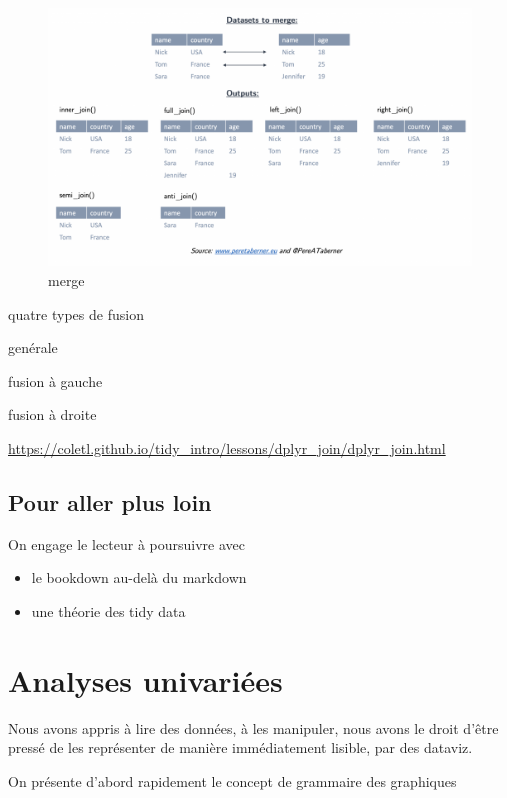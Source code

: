 \documentclass[
]{book}
\providecommand{\tightlist}{%
  \setlength{\itemsep}{0pt}\setlength{\parskip}{0pt}}
\begin{document}
\begin{figure}
\centering
\includegraphics{./Images/merge_ex-1024x624.png}
\caption{merge}
\end{figure}

quatre types de fusion

genérale

fusion à gauche

fusion à droite

\url{https://coletl.github.io/tidy_intro/lessons/dplyr_join/dplyr_join.html}

\hypertarget{pour-aller-plus-loin}{%
\section{Pour aller plus loin}\label{pour-aller-plus-loin}}

On engage le lecteur à poursuivre avec

\begin{itemize}
\tightlist
\item
  le bookdown au-delà du markdown
\item
  une théorie des tidy data
\end{itemize}

\hypertarget{analyses-univariuxe9es}{%
\chapter{Analyses univariées}\label{analyses-univariuxe9es}}

Nous avons appris à lire des données, à les manipuler, nous avons le droit d'être pressé de les représenter de manière immédiatement lisible, par des dataviz.

On présente d'abord rapidement le concept de grammaire des graphiques
\end{document}
